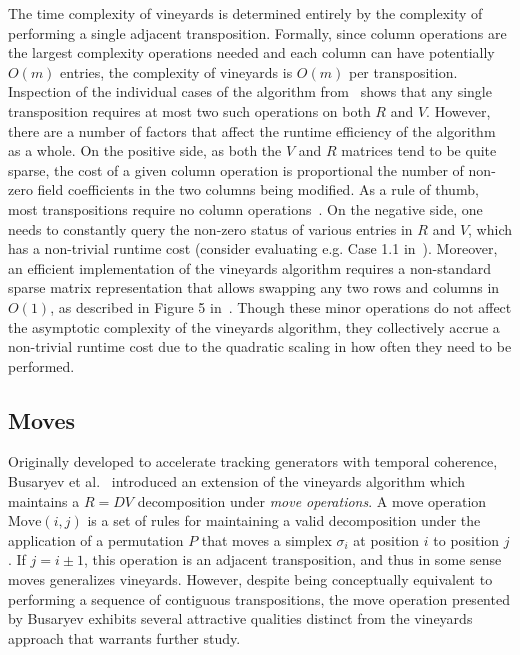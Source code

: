 \documentclass[sn-mathphys]{sn-jnl}
\begin{document}
 The time complexity of vineyards is determined entirely by the complexity of performing a single adjacent transposition.
Formally, since column operations are the largest complexity operations needed and each column can have potentially $O(m)$ entries, the complexity of vineyards is $O(m)$ per transposition. 
Inspection of the individual cases of the algorithm from~\cite{cohen2006vines} shows that any single transposition requires at most two such operations on both $R$ and $V$.
However, there are a number of factors that affect the runtime efficiency of the algorithm as a whole. 
On the positive side, as both the $V$ and $R$ matrices tend to be quite sparse, the cost of a given column operation is proportional the number of non-zero field coefficients in the two columns being modified. As a rule of thumb, most transpositions require no column operations~\cite{edelsbrunner2000topological}. 
On the negative side, one needs to constantly query the non-zero status of various entries in $R$ and $V$, which has a non-trivial runtime cost (consider evaluating e.g. Case 1.1 in~\cite{cohen2006vines}).   
 Moreover, an efficient implementation of the vineyards algorithm requires a non-standard sparse matrix representation that allows swapping any two rows and columns in $O(1)$, as described in Figure 5 in~\cite{cohen2006vines}. 
 Though these minor operations do not affect the asymptotic complexity of the vineyards algorithm, they collectively accrue a non-trivial runtime cost due to the quadratic scaling in how often they need to be performed.   
 

\subsection{Moves}\label{sec:moves} Originally developed to accelerate tracking generators with temporal coherence, Busaryev et al.~\cite{busaryev2010tracking} introduced an extension of the vineyards algorithm which maintains a $R = D V$ decomposition under \emph{move operations}. A move operation $\mathrm{Move}(i,j)$ is a set of rules for maintaining a valid decomposition under the application of a permutation $P$ that moves a simplex $\sigma_i$ at position $i$ to position $j$. If $j = i \pm 1$, this operation is an adjacent transposition, and thus in some sense moves generalizes vineyards.
However, despite being conceptually equivalent to performing a sequence of contiguous transpositions, the move operation presented by Busaryev exhibits several attractive qualities distinct from the vineyards approach that warrants further study.  
\end{document}
